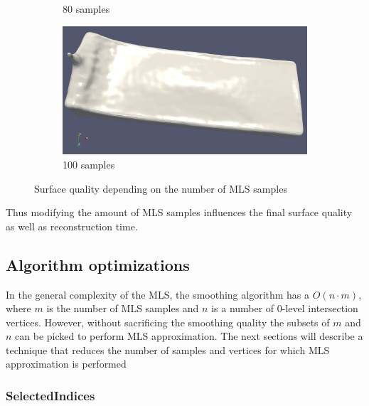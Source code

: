 \begin{figure}[H]
\begin{center}
\begin{subfigure}[b]{0.4\textwidth}
			\caption{80 samples}
		\end{subfigure}
		\begin{subfigure}[b]{0.4\textwidth}
			\includegraphics[width=\textwidth]{figures/MlsSamples100.png}
			\caption{100 samples}
		\end{subfigure}
	\end{center}
	\caption{Surface quality depending on the number of MLS samples} \label{fig:mls_samples_example_surfaces}
\end{figure}
Thus modifying the amount of MLS samples influences the final surface quality as well as reconstruction time. 
\subsection{Algorithm optimizations}
In the general complexity of the MLS, the smoothing algorithm has a $O(n \cdot m)$, where $m$ is the number of MLS samples and $n$ is a number of 0-level intersection vertices. However, without sacrificing the smoothing quality the subsets of $m$ and $n$ can be picked to perform MLS approximation. The next sections will describe a technique that reduces the number of samples and vertices for which MLS approximation is performed 
\subsubsection{SelectedIndices}

